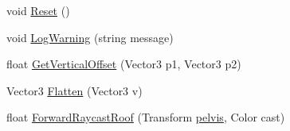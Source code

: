 \begin{DoxyCompactItemize}
\item 
void \mbox{\hyperlink{class_root_motion_1_1_final_i_k_1_1_grounding_ad5444483e0c7608e72d8b5606b64cd2c}{Reset}} ()
\item 
void \mbox{\hyperlink{class_root_motion_1_1_final_i_k_1_1_grounding_a7fabac0d39f802bbd306a8002b6921a9}{Log\+Warning}} (string message)
\item 
float \mbox{\hyperlink{class_root_motion_1_1_final_i_k_1_1_grounding_ad5a6e20c912d62c4c289c91f89618a79}{Get\+Vertical\+Offset}} (Vector3 p1, Vector3 p2)
\item 
Vector3 \mbox{\hyperlink{class_root_motion_1_1_final_i_k_1_1_grounding_af586afd79b7285fa46c587badc7663e2}{Flatten}} (Vector3 v)
\item 
float \mbox{\hyperlink{class_root_motion_1_1_final_i_k_1_1_grounding_ac976b062d8484ace76ef0ecf76c2db6e}{Forward\+Raycast\+Roof}} (Transform \mbox{\hyperlink{class_root_motion_1_1_final_i_k_1_1_grounding_a7a2c4ae7c110994b8990ee7e2eb8d68b}{pelvis}}, Color cast)
\end{DoxyCompactItemize}
